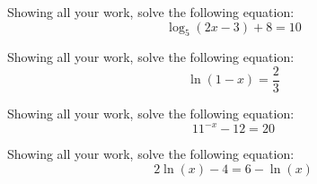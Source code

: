 \documentclass[11pt,letterpaper]{article}
\begin{document}
\newpage



 Showing all your work, solve the following equation: 
	\[
	\log_5(2x - 3) + 8= 10
	\]



\newpage



 Showing all your work, solve the following equation: 
	\[
	\ln(1 - x)= \dfrac{2}{3}
	\]



\newpage



 Showing all your work, solve the following equation: 
	\[
	11^{-x} - 12= 20
	\]



\newpage



 Showing all your work, solve the following equation: 
	\[
	2\ln(x) - 4= 6 - \ln(x)
	\]
\end{document}
